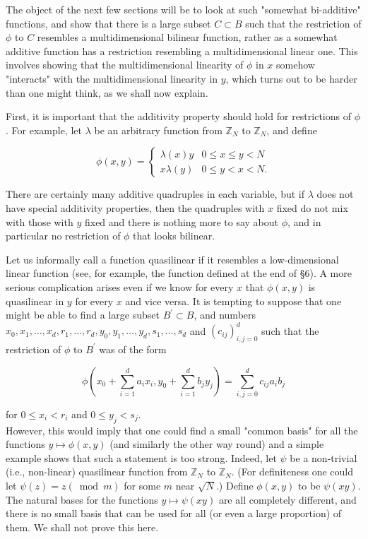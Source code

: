 \documentclass[10pt]{article}
\begin{document}
The object of the next few sections will be to look at such "somewhat bi-additive" functions, and show that there is a large subset $C \subset B$ such that the restriction of $\phi$ to $C$ resembles a multidimensional bilinear function, rather as a somewhat additive function has a restriction resembling a multidimensional linear one. This involves showing that the multidimensional linearity of $\phi$ in $x$ somehow "interacts" with the multidimensional linearity in $y$, which turns out to be harder than one might think, as we shall now explain.

First, it is important that the additivity property should hold for restrictions of $\phi$. For example, let $\lambda$ be an arbitrary function from $\mathbb{Z}_{N}$ to $\mathbb{Z}_{N}$, and define

$$
\phi(x, y)= \begin{cases}\lambda(x) y & 0 \leqslant x \leqslant y<N \\ x \lambda(y) & 0 \leqslant y<x<N .\end{cases}
$$

There are certainly many additive quadruples in each variable, but if $\lambda$ does not have special additivity properties, then the quadruples with $x$ fixed do not mix with those with $y$ fixed and there is nothing more to say about $\phi$, and in particular no restriction of $\phi$ that looks bilinear.

Let us informally call a function quasilinear if it resembles a low-dimensional linear function (see, for example, the function defined at the end of §6). A more serious complication arises even if we know for every $x$ that $\phi(x, y)$ is quasilinear in $y$ for every $x$ and vice versa. It is tempting to suppose that one might be able to find a large subset $B^{\prime} \subset B$, and numbers $x_{0}, x_{1}, \ldots, x_{d}, r_{1}, \ldots, r_{d}, y_{0}, y_{1}, \ldots, y_{d}, s_{1}, \ldots, s_{d}$ and $\left(c_{i j}\right)_{i, j=0}^{d}$ such that the restriction of $\phi$ to $B^{\prime}$ was of the form

$$
\phi\left(x_{0}+\sum_{i=1}^{d} a_{i} x_{i}, y_{0}+\sum_{i=1}^{d} b_{j} y_{j}\right)=\sum_{i, j=0}^{d} c_{i j} a_{i} b_{j}
$$

for $0 \leqslant x_{i}<r_{i}$ and $0 \leqslant y_{j}<s_{j}$.\\
However, this would imply that one could find a small "common basis" for all the functions $y \mapsto \phi(x, y)$ (and similarly the other way round) and a simple example shows that such a statement is too strong. Indeed, let $\psi$ be a non-trivial (i.e., non-linear) quasilinear function from $\mathbb{Z}_{N}$ to $\mathbb{Z}_{N}$. (For definiteness one could let $\psi(z)=z(\bmod m)$ for some $m$ near $\sqrt{N}$.) Define $\phi(x, y)$ to be $\psi(x y)$. The natural bases for the functions $y \mapsto \psi(x y)$ are all completely different, and there is no small basis that can be used for all (or even a large proportion) of them. We shall not prove this here.
\end{document}
